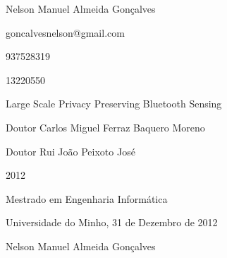\par\vspace{10mm}
 Nelson Manuel Almeida Gonçalves
\par\vspace{3mm}
 goncalvesnelson@gmail.com
\par\vspace{3mm}
 937528319
\par\vspace{3mm}
 13220550
\par\vspace{3mm}
 Large Scale Privacy Preserving Bluetooth Sensing
\par\vspace{3mm}
 Doutor Carlos Miguel Ferraz Baquero Moreno
\par\vspace{3mm}
 Doutor Rui João Peixoto José
\par\vspace{3mm}
 2012
\par\vspace{3mm}
 Mestrado em Engenharia Informática
\par\vspace{20mm}
\par\vspace{10mm}
\begin{center}
Universidade do Minho, 31 de Dezembro de 2012
\par\vspace{3mm}
Nelson Manuel Almeida Gonçalves
\end{center}
